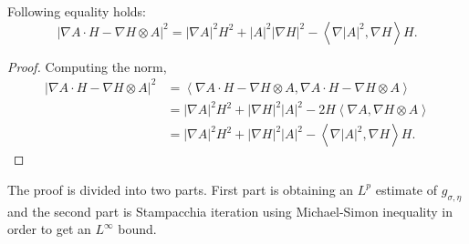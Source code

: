 \begin{lemma}
    Following equality holds: 
    \begin{equation}
        |\nabla A \cdot H - \nabla H \otimes A|^{2} = | \nabla A|^{2}H^{2} + |A|^{2}| \nabla H|^{2} - \left<  \nabla |A|^{2}, \nabla H \right>H.
    \end{equation}
\end{lemma}
\begin{proof}
    Computing the norm, 
    \begin{align*}
        |\nabla A \cdot H - \nabla H \otimes A|^{2} & = \left<  \nabla A \cdot H - \nabla H \otimes A, \nabla A \cdot H - \nabla H \otimes A  \right> \\
        & = |\nabla A|^{2}H^{2} + |\nabla H|^{2}|A|^{2} - 2H\left< \nabla A, \nabla H \otimes A \right> \\
        & = |\nabla A|^{2}H^{2} + |\nabla H|^{2}|A|^{2} - \left< \nabla |A|^{2}, \nabla H \right>H.
    \end{align*}
\end{proof}

The proof is divided into two parts. First part is obtaining an $ L^{p} $ estimate of $ g_{ \sigma, \eta} $ and the second part is Stampacchia iteration using Michael-Simon inequality in order to get an $ L^{\infty} $ bound. 

